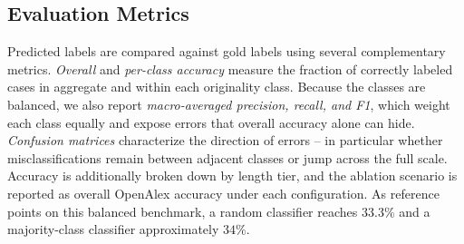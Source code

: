 \subsection{Evaluation Metrics}

Predicted labels are compared against gold labels using several complementary metrics. \emph{Overall} and \emph{per-class accuracy} measure the fraction of correctly labeled cases in aggregate and within each originality class. Because the classes are balanced, we also report \emph{macro-averaged precision, recall, and F1}, which weight each class equally and expose errors that overall accuracy alone can hide. \emph{Confusion matrices} characterize the direction of errors -- in particular whether misclassifications remain between adjacent classes or jump across the full scale. Accuracy is additionally broken down by length tier, and the ablation scenario is reported as overall OpenAlex accuracy under each configuration. As reference points on this balanced benchmark, a random classifier reaches $33.3\%$ and a majority-class classifier approximately $34\%$.


